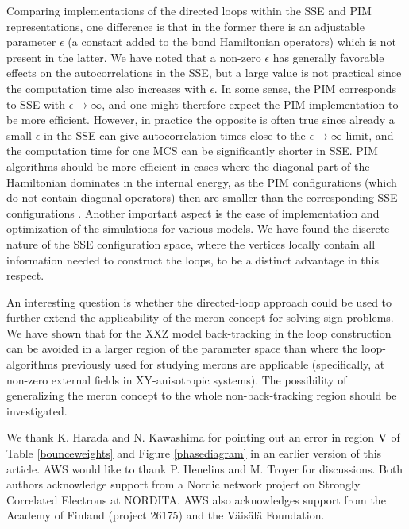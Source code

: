\documentclass[10pt,pre,aps,twocolumn,showpacs,superscriptaddress,
floatfix]{revtex4}
\begin{document}
Comparing implementations of the directed loops within the SSE and PIM
representations, one difference is that in the former there is an adjustable 
parameter $\epsilon$ (a constant added to the bond Hamiltonian operators)
which is not present in the latter. We have noted that a non-zero 
$\epsilon$ has generally favorable effects on the autocorrelations in the 
SSE, but a large value is not practical since the computation time also 
increases with $\epsilon$. In some sense, the PIM corresponds to SSE with 
$\epsilon \to \infty$, and one might therefore expect the PIM implementation to
be more efficient. However, in practice the opposite is often true since 
already a small $\epsilon$ in the SSE can give autocorrelation times close to 
the $\epsilon \to \infty$ limit, and the computation time for one MCS 
can be significantly shorter in SSE. PIM algorithms should be more 
efficient in cases where the diagonal part of the Hamiltonian dominates in 
the internal energy, as the PIM configurations (which do not contain diagonal 
operators) then are smaller than the corresponding SSE configurations
\cite{irsse}. Another important aspect is the ease of implementation and 
optimization of the simulations for various models. We have found the discrete
nature of the SSE configuration space, where the vertices locally contain all
information needed to construct the loops, to be a distinct advantage in 
this respect.

An interesting question is whether the directed-loop approach could be used 
to further extend the applicability of the meron concept \cite{chandrasekharan}
for solving sign problems. We have shown that for the XXZ model back-tracking
in the loop construction can be avoided in a larger region of the parameter 
space than where the loop-algorithms previously used for studying merons are 
applicable (specifically, at non-zero external fields in XY-anisotropic 
systems). The possibility of generalizing the meron concept to the whole 
non-back-tracking region should be investigated.

\begin{acknowledgments}
We thank K. Harada and N. Kawashima for pointing out an error in region 
$\rm V$ of Table \ref{bounceweights} and Figure \ref{phasediagram} in an 
earlier version of this article. 
AWS would like to thank P. Henelius and M. Troyer for 
discussions. Both authors acknowledge support from a Nordic network project 
on Strongly Correlated Electrons at NORDITA. AWS also acknowledges support 
from the Academy of Finland (project 26175) and the V\"ais\"al\"a Foundation.
\end{acknowledgments}
\end{document}
